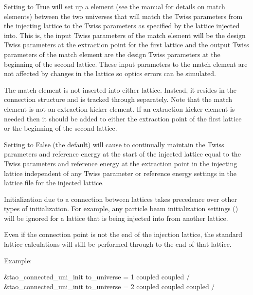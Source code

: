 {{{{{{{{{{{{{Setting  to True will set up a  element
(see the \bmad manual for details on match elements) between the two
universes that will match the  Twiss parameters from the
injecting lattice to the  Twiss parameters as specified by
the lattice injected into. This is, the input Twiss parameters of the
match element will be the design Twiss parameters at the extraction
point for the first lattice and the output Twiss parameters of the
match element are the design Twiss parameters at the beginning of the
second lattice. These input parameters to the match element are not
affected by changes in the  lattice so optics errors can be
simulated.

The match element is not inserted into either lattice. Instead, it
resides in the \tao connection structure and is tracked through
separately. Note that the match element is not an extraction kicker
element. If an extraction kicker element is needed then it should be
added to either the extraction point of the first lattice or the
beginning of the second lattice.

Setting  to False (the default) will cause \tao to
continually maintain the  Twiss parameters and reference
energy at the start of the injected lattice equal to the 
Twiss parameters and reference energy at the extraction point in the
injecting lattice independent of any Twiss parameter or reference
energy settings in the lattice file for the injected lattice.

Initialization due to a connection between lattices takes precedence
over other types of initialization. For example, any particle beam
initialization settings () will be ignored for a
lattice that is being injected into from another lattice.

Even if the connection point is not the end of the injection lattice,
the standard lattice calculations will still be performed through to
the end of that lattice.

Example:
\begin{example}
  &tao_connected_uni_init
    to_universe = 1
    coupled%
    coupled%
  /
  &tao_connected_uni_init
    to_universe = 2
    coupled%
    coupled%
    coupled%
  /
\end{example}

}}}}}}}}}}}}}
